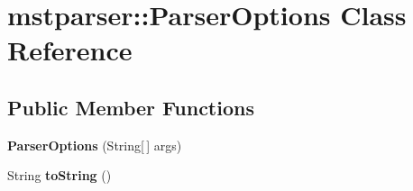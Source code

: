 \hypertarget{classmstparser_1_1ParserOptions}{
\section{mstparser::ParserOptions Class Reference}
\label{classmstparser_1_1ParserOptions}
}
\subsection*{Public Member Functions}
\begin{DoxyCompactItemize}
\item 
\hypertarget{classmstparser_1_1ParserOptions_aab1d2428e2e89b5893c0ddda48cbde1c}{
{\bfseries ParserOptions} (String\mbox{[}$\,$\mbox{]} args)}
\label{classmstparser_1_1ParserOptions_aab1d2428e2e89b5893c0ddda48cbde1c}

\item 
\hypertarget{classmstparser_1_1ParserOptions_a6833e87d7966cf03744dcfc9845c4d5e}{
String {\bfseries toString} ()}
\label{classmstparser_1_1ParserOptions_a6833e87d7966cf03744dcfc9845c4d5e}

\end{DoxyCompactItemize}
